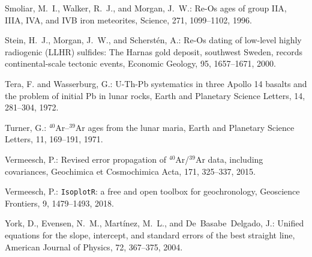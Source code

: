 \documentclass[]{article}
\begin{document}
\begin{thebibliography}{14}
Smoliar, M.~I., Walker, R.~J., and Morgan, J.~W.: {Re-Os ages of group IIA,
  IIIA, IVA, and IVB iron meteorites}, Science, 271, 1099--1102, 1996.

Stein, H.~J., Morgan, J.~W., and Scherst{\'e}n, A.: {Re-Os dating of low-level
  highly radiogenic (LLHR) sulfides: The Harnas gold deposit, southwest Sweden,
  records continental-scale tectonic events}, Economic Geology, 95, 1657--1671,
  2000.

Tera, F. and Wasserburg, G.: {U-Th-Pb systematics in three Apollo 14 basalts
  and the problem of initial Pb in lunar rocks}, Earth and Planetary Science
  Letters, 14, 281--304, 1972.

Turner, G.: {$^{40}$Ar--$^{39}$Ar ages from the lunar maria}, Earth and
  Planetary Science Letters, 11, 169--191, 1971.

Vermeesch, P.: {Revised error propagation of $^{40}$Ar/$^{39}$Ar data,
  including covariances}, Geochimica et Cosmochimica Acta, 171, 325--337, 2015.

Vermeesch, P.: {\texttt{IsoplotR}: a free and open toolbox for geochronology},
  Geoscience Frontiers, 9, 1479--1493, 2018.

York, D., Evensen, N.~M., Mart\'{i}nez, M.~L., and De~Basabe~Delgado, J.:
  {Unified equations for the slope, intercept, and standard errors of the best
  straight line}, American Journal of Physics, 72, 367--375, 2004.

\end{thebibliography}






\end{document}
